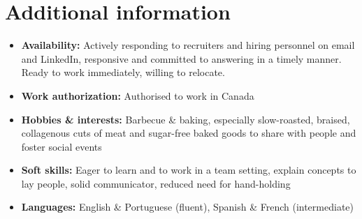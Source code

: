 \section{Additional information}

\begin{itemize}
    \item \textbf{Availability:} Actively responding to recruiters and hiring personnel on email and LinkedIn, responsive and committed to answering in a timely manner. Ready to work immediately, willing to relocate.
    \item \textbf{Work authorization:} Authorised to work in Canada
    \item \textbf{Hobbies \& interests:} Barbecue \& baking, especially slow-roasted, braised, collagenous cuts of meat and sugar-free baked goods to share with people and foster social events
    \item \textbf{Soft skills:} Eager to learn and to work in a team setting, explain concepts to lay people, solid communicator, reduced need for hand-holding
    \item \textbf{Languages:} English \& Portuguese (fluent), Spanish \& French (intermediate)
\end{itemize}
